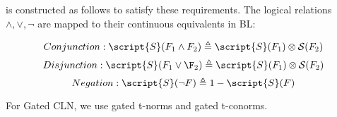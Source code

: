  is constructed as follows to satisfy these requirements. The
logical relations {$\wedge, \lor, \lnot$} are mapped to their continuous
equivalents in BL:

$$Conjunction: \script{S}(F_{1} \wedge F_{2}) \triangleq \script{S} (F_{1}) \otimes \mathcal{S} (F_{2})$$
$$Disjunction: \script{S}(F_{1} \lor \F_{2}) \triangleq \script{S} (F_{1}) \otimes \mathcal{S} (F_{2})$$
$$Negation: \script{S}(\neg{F}) \triangleq 1 - \script{S}(F)$$

For Gated CLN, we use gated t-norms and gated t-conorms.